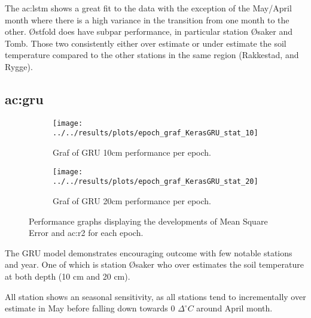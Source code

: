 The \acrshort{ac:lstm} shows a great fit to the data with the exception of the May/April month where there is a high variance in the transition from one month to the other. Østfold does have subpar performance, in particular station Øsaker and Tomb. Those two consistently either over estimate or under estimate the soil temperature compared to the other stations in the same region (Rakkestad, and Rygge). 

\subsection{\acrfull{ac:gru}}

\begin{figure}
	\begin{subfigure}{0.45\textwidth}
		\centering
		\begin{adjustwidth}{-1in}{-1in}
			\texttt{[image: ../../results/plots/epoch\_graf\_KerasGRU\_stat\_10]}
		\end{adjustwidth}
		\caption[Epoch graph GRU 10cm]{Graf of GRU 10cm performance per epoch.}
		\label{fig:epochgrafKerasGRUstat10}
	\end{subfigure}
	\begin{subfigure}{0.45\textwidth}
		\centering
		\begin{adjustwidth}{-1in}{-1in}
			\texttt{[image: ../../results/plots/epoch\_graf\_KerasGRU\_stat\_20]}
		\end{adjustwidth}
		\caption[Epoch graph GRU 20cm]{Graf of GRU 20cm performance per epoch.}
		\label{fig:epochgrafKerasGRUstat20}
	\end{subfigure}
	\caption{Performance graphs displaying the developments of Mean Square Error and \acrfull{ac:r2} for each epoch.}
\end{figure}

The GRU model demonstrates encouraging outcome with few notable stations and year. One of which is station Øsaker who over estimates the soil temperature at both depth (10 cm and 20 cm). 

All station shows an seasonal sensitivity, as all stations tend to incrementally over estimate in May before falling down towards 0 $\Delta^\circ C$ around April month. 

